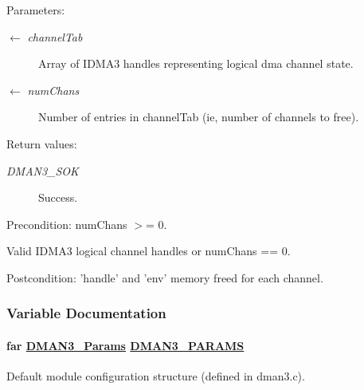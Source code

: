 \begin{Desc}
\item[Parameters:]
\begin{description}
\item[\mbox{$\leftarrow$} {\em channel\-Tab}]Array of IDMA3 handles representing logical dma channel state. \item[\mbox{$\leftarrow$} {\em num\-Chans}]Number of entries in channel\-Tab (ie, number of channels to free).\end{description}
\end{Desc}
\begin{Desc}
\item[Return values:]
\begin{description}
\item[{\em DMAN3\_\-SOK}]Success.\end{description}
\end{Desc}
\begin{Desc}
\item[Precondition:]num\-Chans $>$= 0. 

Valid IDMA3 logical channel handles or num\-Chans == 0.\end{Desc}
\begin{Desc}
\item[Postcondition:]'handle' and 'env' memory freed for each channel. \end{Desc}


\subsubsection{Variable Documentation}
\hypertarget{group___d_s_p_d_m_a_n3_g553609efedb936222e4492f0ffa3d1cc}{
\paragraph[DMAN3\_\-PARAMS]{\setlength{\rightskip}{0pt plus 5cm}far \hyperlink{struct_d_m_a_n3___params}{DMAN3\_\-Params} \hyperlink{group___d_s_p_d_m_a_n3_g553609efedb936222e4492f0ffa3d1cc}{DMAN3\_\-PARAMS}}\hfill}
\label{group___d_s_p_d_m_a_n3_g553609efedb936222e4492f0ffa3d1cc}


Default module configuration structure (defined in dman3.c). 

